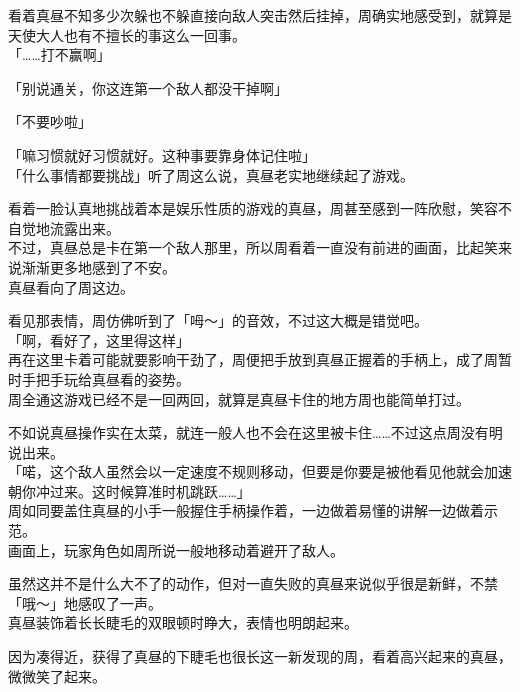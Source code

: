 看着真昼不知多少次躲也不躲直接向敌人突击然后挂掉，周确实地感受到，就算是天使大人也有不擅长的事这么一回事。\\

「……打不赢啊」

「别说通关，你这连第一个敌人都没干掉啊」

「不要吵啦」

「嘛习惯就好习惯就好。这种事要靠身体记住啦」\\

「什么事情都要挑战」听了周这么说，真昼老实地继续起了游戏。

看着一脸认真地挑战着本是娱乐性质的游戏的真昼，周甚至感到一阵欣慰，笑容不自觉地流露出来。\\

不过，真昼总是卡在第一个敌人那里，所以周看着一直没有前进的画面，比起笑来说渐渐更多地感到了不安。\\

真昼看向了周这边。

看见那表情，周仿佛听到了「呣～」的音效，不过这大概是错觉吧。\\

「啊，看好了，这里得这样」\\

再在这里卡着可能就要影响干劲了，周便把手放到真昼正握着的手柄上，成了周暂时手把手玩给真昼看的姿势。\\

周全通这游戏已经不是一回两回，就算是真昼卡住的地方周也能简单打过。

不如说真昼操作实在太菜，就连一般人也不会在这里被卡住……不过这点周没有明说出来。\\

「喏，这个敌人虽然会以一定速度不规则移动，但要是你要是被他看见他就会加速朝你冲过来。这时候算准时机跳跃……」\\

周如同要盖住真昼的小手一般握住手柄操作着，一边做着易懂的讲解一边做着示范。\\

画面上，玩家角色如周所说一般地移动着避开了敌人。

虽然这并不是什么大不了的动作，但对一直失败的真昼来说似乎很是新鲜，不禁「哦～」地感叹了一声。\\

真昼装饰着长长睫毛的双眼顿时睁大，表情也明朗起来。

因为凑得近，获得了真昼的下睫毛也很长这一新发现的周，看着高兴起来的真昼，微微笑了起来。\\

